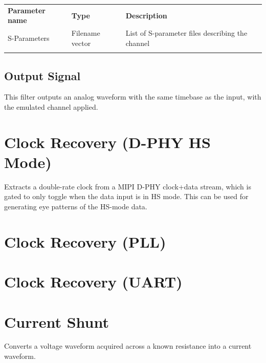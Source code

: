 \begin{tabularx}{16cm}{llX}
\thickhline
\textbf{Parameter name} & \textbf{Type} & \textbf{Description} \\
\thickhline
S-Parameters & Filename vector & List of S-parameter files describing the channel\\
\thickhline
\end{tabularx}

\subsection{Output Signal}

This filter outputs an analog waveform with the same timebase as the input, with the emulated channel applied.

\pagebreak
\section{Clock Recovery (D-PHY HS Mode)}

Extracts a double-rate clock from a MIPI D-PHY clock+data stream, which is gated to only toggle when the data input
is in HS mode. This can be used for generating eye patterns of the HS-mode data.

\pagebreak
\section{Clock Recovery (PLL)}
\label{filter:cdrpll}

\pagebreak
\section{Clock Recovery (UART)}

\pagebreak
\section{Current Shunt}

Converts a voltage waveform acquired across a known resistance into a current waveform.

